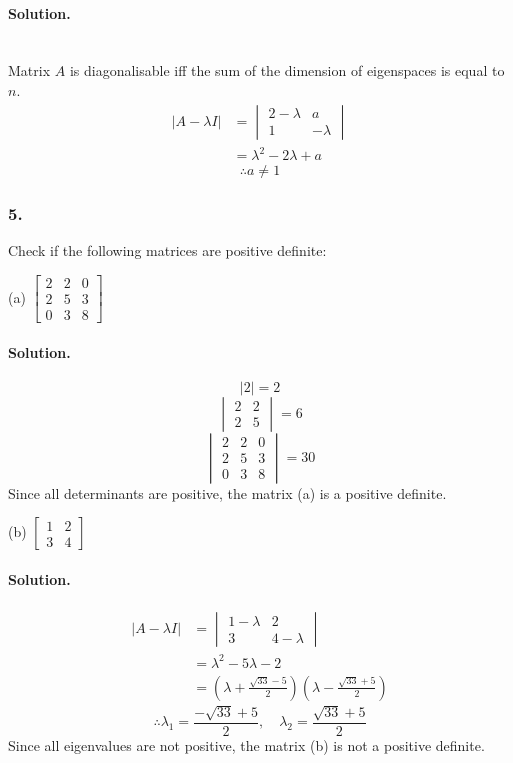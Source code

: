 \paragraph{Solution.}\phantom{}\\
Matrix $A$ is diagonalisable iff the sum of the dimension of eigenspaces is equal to $n$.
\begin{align*}
    |A-\lambda I| &= \begin{vmatrix}
        2-\lambda&a\\
        1&-\lambda
    \end{vmatrix}\\
    &= \lambda^2 - 2\lambda + a
\end{align*}
$$\therefore a \neq 1$$
\subsubsection{5.} Check if the following matrices are positive definite:

(a) $\begin{bmatrix}
    2&2&0\\
    2&5&3\\
    0&3&8
\end{bmatrix}$
\paragraph{Solution.}
$$|2| = 2$$
$$\begin{vmatrix}
    2&2\\
    2&5
\end{vmatrix}=6$$
$$\begin{vmatrix}
    2&2&0\\
    2&5&3\\
    0&3&8
\end{vmatrix}=30$$
Since all determinants are positive, the matrix (a) is a positive definite.


(b) $\begin{bmatrix}
    1&2\\3&4
\end{bmatrix}$
\paragraph{Solution.}
\begin{align*}
    |A-\lambda I| &= \begin{vmatrix}
        1-\lambda & 2\\3 & 4 - \lambda
    \end{vmatrix}\\
    &= \lambda^2 - 5\lambda - 2\\
    &= (\lambda + \frac{\sqrt{33} - 5}{2})(\lambda - \frac{\sqrt{33} + 5}{2})
\end{align*}
$$\therefore \lambda_1 = \frac{-\sqrt{33}+5}{2},\quad \lambda_2 = \frac{\sqrt{33}+5}{2}$$
Since all eigenvalues are not positive, the matrix (b) is not a positive definite.
\newpage
